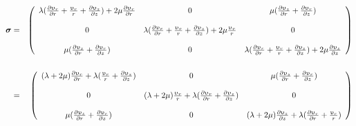 \begin{eqnarray}
{\bm \sigma}
&=&
\left(
\begin{array}{ccc}
\lambda({\partial  \upupsilon_r \over \partial  r}
+{\upupsilon_r \over r} +{\partial  \upupsilon_{z} \over \partial z}) +
2\mu {\partial  \upupsilon_r \over \partial  r} &
0 & \mu({\partial \upupsilon_{z} \over \partial  r} + {\partial \upupsilon_r \over \partial z} ) \\
\\
0 & \lambda({\partial \upupsilon_r \over \partial r}
+{\upupsilon_r \over r} +{\partial \upupsilon_{z} \over \partial z}) + 2\mu{\upupsilon_r \over r} & 0 \\
\\
\mu({\partial \upupsilon_{z} \over \partial r} + 
{\partial \upupsilon_r \over \partial z} )&0 & 
\lambda({\partial \upupsilon_r \over \partial r}
+{\upupsilon_r \over r} +{\partial \upupsilon_{z} \over \partial z}) +
2\mu{\partial  \upupsilon_{z} \over \partial z}
\end{array}
\right) \nonumber\\ \nonumber\\
&=&
\left(
\begin{array}{ccc}
(\lambda+ 2\mu) {\partial \upupsilon_r \over \partial r}
+\lambda ({\upupsilon_r \over r} +{\partial  \upupsilon_{z} \over \partial z})  &
0 &
\mu({\partial \upupsilon_{z} \over \partial  r} + 
{\partial \upupsilon_r \over \partial z} ) \\
\\
0 &
(\lambda+2\mu) \frac{\upupsilon_r}{r}
+ \lambda({\partial  \upupsilon_r \over \partial r}
+{\partial \upupsilon_{z} \over \partial z}) &
0 \\
\\
\mu({\partial \upupsilon_{z} \over \partial r} + 
{\partial \upupsilon_r \over \partial z} ) &
0 &
(\lambda+2\mu) \frac{\partial \upupsilon_z}{\partial z}
+\lambda({\partial \upupsilon_r \over \partial r}
+{\upupsilon_r \over r} ) 
\end{array}
\right) \nonumber
\end{eqnarray}

